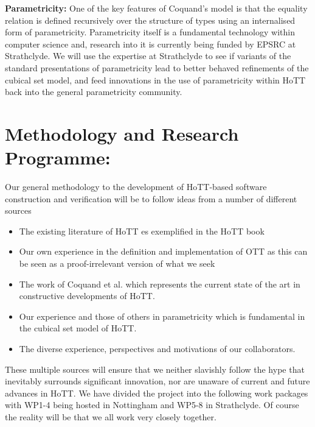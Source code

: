 \documentclass[a4paper,11pt]{article}
\begin{document}
{\bf Parametricity:} One of the key features of Coquand's model is that
the equality relation is defined recursively over the structure of
types using an internalised form of parametricity. Parametricity
itself is a fundamental technology within computer science and,
research into it is currently being funded by EPSRC at Strathclyde. We
will use the expertise at Strathclyde to see if variants of the
standard presentations of parametricity lead to better behaved
refinements of the cubical set model, and feed innovations in the use
of parametricity within HoTT back into the general parametricity
community.



\section{Methodology and Research Programme:}
Our general methodology to the development of HoTT-based software
construction and verification will be to follow ideas from a number of
different sources
\begin{itemize}
\item The existing literature of HoTT es exemplified in the HoTT book
\item Our own experience in the definition and implementation of OTT as
  this can be seen as a proof-irrelevant version of what we seek
\item The work of Coquand et al. which represents the current state of
  the art in constructive developments of HoTT.
\item Our experience and those of others in parametricity which is
  fundamental in the cubical set model of HoTT.
\item The diverse experience, perspectives and motivations of our collaborators.
\end{itemize}
These multiple sources will ensure that we neither slavishly follow
the hype that inevitably surrounds significant innovation, nor are
unaware of current and future advances in HoTT. We have divided the
project into the following work packages with WP1-4 being hosted in
Nottingham and WP5-8 in Strathclyde. Of course the reality will be
that we all work very closely together.
 
\end{document}

